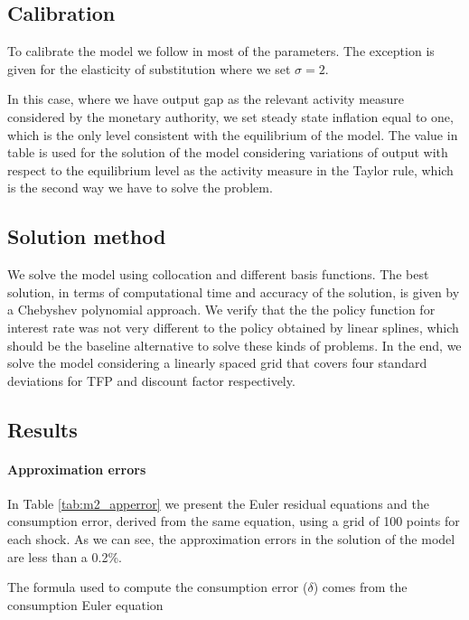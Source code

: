 \documentclass[12pt]{article}
\numberwithin{equation}{section}
\begin{document}
\subsection{Calibration}

To calibrate the model we follow \cite{Fernandez-VillaverdeEtAl2015} in most of the parameters. The exception is given for the elasticity of substitution where we set $\sigma=2$. 

In this case, where we have output gap as the relevant activity measure considered by the monetary authority, we set steady state inflation equal to one, which is the only level consistent with the equilibrium of the model. The value in table is used for the solution of the model considering variations of output with respect to the equilibrium level as the activity measure in the Taylor rule, which is the second way we have to solve the problem.



\subsection{Solution method}

We solve the model using collocation and different basis functions. The best solution, in terms of computational time and accuracy of the solution, is given by a Chebyshev polynomial approach. We verify that the the policy function for interest rate was not very different to the policy obtained by linear splines, which should be the baseline alternative to solve these kinds of problems. In the end, we solve the model considering a linearly spaced grid that covers four standard deviations for TFP and discount factor respectively.

\subsection{Results}

\paragraph{Approximation errors} In Table \ref{tab:m2_apperror} we present the Euler residual equations and the consumption error, derived from the same equation, using a grid of 100 points for each shock. As we can see, the approximation errors in the solution of the model are less than a 0.2\%.

The formula used to compute the consumption error ($\delta$) comes from the consumption Euler equation
\end{document}
